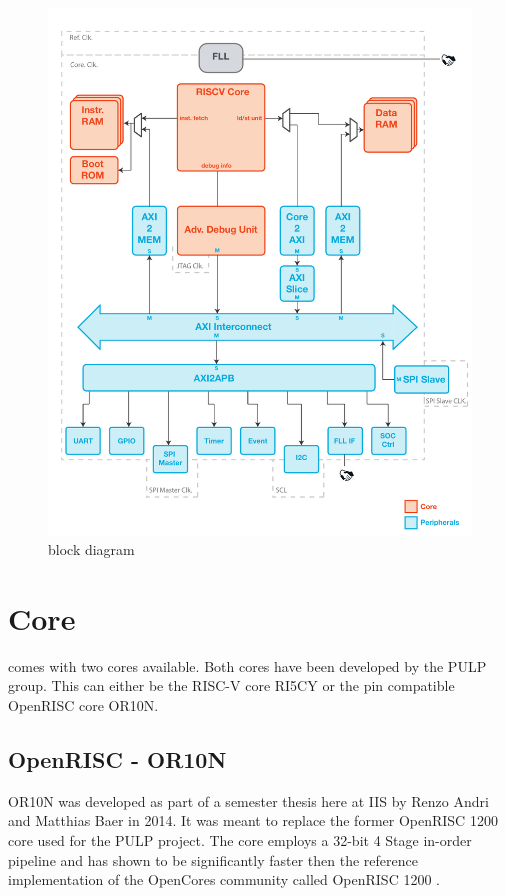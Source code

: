 \begin{figure}[th]
  \centering
  \includegraphics[width=\linewidth]{./figures/pulpino_blockdiagram}
  \caption{\pulpino block diagram}
  \label{fig:block_diagram}
\end{figure}


\section{Core}

\pulpino comes with two cores available. Both cores have been developed by the PULP group. This can either be the RISC-V core RI5CY or the pin compatible OpenRISC core OR10N.

\subsection{OpenRISC - OR10N}

OR10N was developed as part of a semester thesis here at IIS by Renzo Andri and Matthias Baer in 2014. It was meant to replace the former OpenRISC 1200 core used for the PULP project. The core employs a 32-bit 4 Stage in-order pipeline and has shown to be significantly faster then the reference implementation of the OpenCores community called OpenRISC 1200 \cite{renzobaer}.

